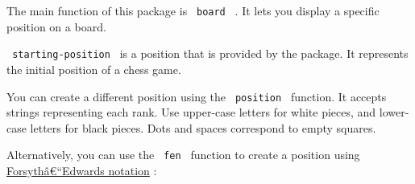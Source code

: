 The main function of this package is \texttt{\ board\ } . It lets you
display a specific position on a board.

\begin{Shaded}
\begin{Highlighting}[]
\end{Highlighting}
\end{Shaded}

\pandocbounded{}

\texttt{\ starting-position\ } is a position that is provided by the
package. It represents the initial position of a chess game.

You can create a different position using the \texttt{\ position\ }
function. It accepts strings representing each rank. Use upper-case
letters for white pieces, and lower-case letters for black pieces. Dots
and spaces correspond to empty squares.

\begin{Shaded}
\begin{Highlighting}[]
\NormalTok{))}
\end{Highlighting}
\end{Shaded}

\pandocbounded{}

Alternatively, you can use the \texttt{\ fen\ } function to create a
position using
\href{https://en.wikipedia.org/wiki/Forsyth\%E2\%80\%93Edwards_Notation}{Forsythâ€``Edwards
notation} :

\begin{Shaded}
\begin{Highlighting}[]
\end{Highlighting}
\end{Shaded}

\pandocbounded{}


